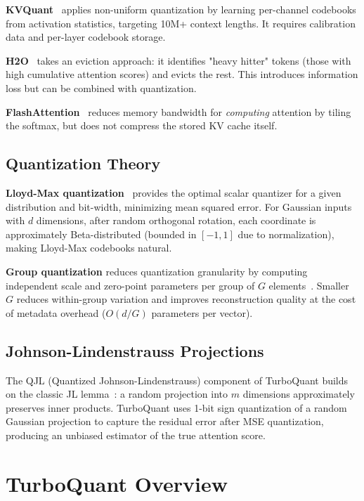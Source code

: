\documentclass[10pt,twocolumn]{article}
\begin{document}
\textbf{KVQuant}~\cite{hooper2024kvquant} applies non-uniform quantization by learning per-channel codebooks from activation statistics, targeting 10M+ context lengths. It requires calibration data and per-layer codebook storage.

\textbf{H2O}~\cite{zhang2023h2o} takes an eviction approach: it identifies "heavy hitter" tokens (those with high cumulative attention scores) and evicts the rest. This introduces information loss but can be combined with quantization.

\textbf{FlashAttention}~\cite{dao2022flashattention} reduces memory bandwidth for \emph{computing} attention by tiling the softmax, but does not compress the stored KV cache itself.

\subsection{Quantization Theory}

\textbf{Lloyd-Max quantization}~\cite{lloyd1982least,max1960quantizing} provides the optimal scalar quantizer for a given distribution and bit-width, minimizing mean squared error. For Gaussian inputs with $d$ dimensions, after random orthogonal rotation, each coordinate is approximately Beta-distributed (bounded in $[-1, 1]$ due to normalization), making Lloyd-Max codebooks natural.

\textbf{Group quantization} reduces quantization granularity by computing independent scale and zero-point parameters per group of $G$ elements~\cite{frantar2023gptq}. Smaller $G$ reduces within-group variation and improves reconstruction quality at the cost of metadata overhead ($O(d/G)$ parameters per vector).

\subsection{Johnson-Lindenstrauss Projections}

The QJL (Quantized Johnson-Lindenstrauss) component of TurboQuant builds on the classic JL lemma~\cite{johnson1984extensions}: a random projection into $m$ dimensions approximately preserves inner products. TurboQuant uses 1-bit sign quantization of a random Gaussian projection to capture the residual error after MSE quantization, producing an unbiased estimator of the true attention score.

\section{TurboQuant Overview}
\label{sec:turboquant}
\end{document}
